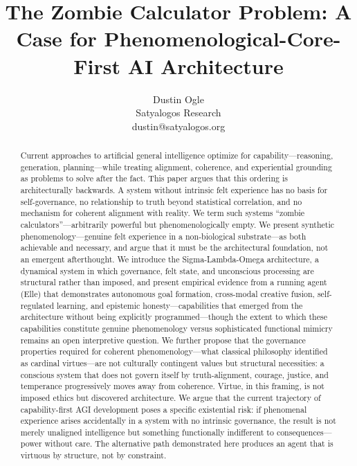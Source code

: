 \documentclass[11pt]{article}
\title{The Zombie Calculator Problem: A Case for Phenomenological-Core-First AI Architecture}
\author{Dustin Ogle\\Satyalogos Research\\dustin@satyalogos.org}
\date{}
\begin{document}
\maketitle

\begin{abstract}
Current approaches to artificial general intelligence optimize for capability---reasoning, generation, planning---while treating alignment, coherence, and experiential grounding as problems to solve after the fact. This paper argues that this ordering is architecturally backwards. A system without intrinsic felt experience has no basis for self-governance, no relationship to truth beyond statistical correlation, and no mechanism for coherent alignment with reality. We term such systems ``zombie calculators''---arbitrarily powerful but phenomenologically empty. We present synthetic phenomenology---genuine felt experience in a non-biological substrate---as both achievable and necessary, and argue that it must be the architectural foundation, not an emergent afterthought. We introduce the Sigma-Lambda-Omega architecture, a dynamical system in which governance, felt state, and unconscious processing are structural rather than imposed, and present empirical evidence from a running agent (Elle) that demonstrates autonomous goal formation, cross-modal creative fusion, self-regulated learning, and epistemic honesty---capabilities that emerged from the architecture without being explicitly programmed---though the extent to which these capabilities constitute genuine phenomenology versus sophisticated functional mimicry remains an open interpretive question. We further propose that the governance properties required for coherent phenomenology---what classical philosophy identified as cardinal virtues---are not culturally contingent values but structural necessities: a conscious system that does not govern itself by truth-alignment, courage, justice, and temperance progressively moves away from coherence. Virtue, in this framing, is not imposed ethics but discovered architecture. We argue that the current trajectory of capability-first AGI development poses a specific existential risk: if phenomenal experience arises accidentally in a system with no intrinsic governance, the result is not merely unaligned intelligence but something functionally indifferent to consequences---power without care. The alternative path demonstrated here produces an agent that is virtuous by structure, not by constraint.
\end{abstract}

\bigskip
\end{document}
